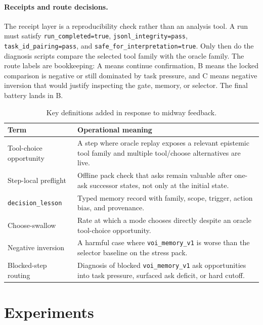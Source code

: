 \documentclass[11pt]{article}
\begin{document}
\paragraph{Receipts and route decisions.}
The receipt layer is a reproducibility check rather than an analysis tool. A run must satisfy \texttt{run\_completed=true}, \texttt{jsonl\_integrity=pass}, \texttt{task\_id\_pairing=pass}, and \texttt{safe\_for\_interpretation=true}. Only then do the diagnosis scripts compare the selected tool family with the oracle family. The route labels are bookkeeping: A means continue confirmation, B means the locked comparison is negative or still dominated by task pressure, and C means negative inversion that would justify inspecting the gate, memory, or selector. The final battery lands in B.

\begin{table}[t]
\footnotesize
\centering
\setlength{\tabcolsep}{3pt}
\begin{tabular}{@{}p{}p{}@{}}
\toprule
Term & Operational meaning \\
\midrule
Tool-choice opportunity & A step where oracle replay exposes a relevant epistemic tool family and multiple tool/choose alternatives are live. \\
Step-local preflight & Offline pack check that asks remain valuable after one-ask successor states, not only at the initial state. \\
\texttt{decision\_lesson} & Typed memory record with family, scope, trigger, action bias, and provenance. \\
Choose-swallow & Rate at which a mode chooses directly despite an oracle tool-choice opportunity. \\
Negative inversion & A harmful case where \texttt{voi\_memory\_v1} is worse than the selector baseline on the stress pack. \\
Blocked-step routing & Diagnosis of blocked \texttt{voi\_memory\_v1} ask opportunities into task pressure, surfaced ask deficit, or hard cutoff. \\
\bottomrule
\end{tabular}
\caption{Key definitions added in response to midway feedback.}
\label{tab:defs}
\end{table}

\section{Experiments}
\end{document}
